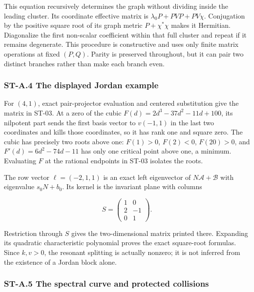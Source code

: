 \documentclass[a4paper,11pt]{article}
\numberwithin{equation}{section}
\begin{document}
This equation recursively determines the graph without dividing inside the leading cluster. Its coordinate effective matrix is \(\lambda_0P+PVP+PV\chi\). Conjugation by the positive square root of its graph metric \(P+\chi^*\chi\) makes it Hermitian. Diagonalize the first non-scalar coefficient within that full cluster and repeat if it remains degenerate. This procedure is constructive and uses only finite matrix operations at fixed \((P,Q)\). Parity is preserved throughout, but it can pair two distinct branches rather than make each branch even.

\hypertarget{st-a.4-the-displayed-jordan-example}{%
\subsubsection{ST-A.4 The displayed Jordan example}\label{st-a.4-the-displayed-jordan-example}}

For \((4,1)\), exact pair-projector evaluation and centered substitution give the matrix in ST-03. At a zero of the cubic \(F(d)=2d^3-37d^2-11d+100\), its nilpotent part sends the first basis vector to \(v(-1,1)\) in the last two coordinates and kills those coordinates, so it has rank one and square zero. The cubic has precisely two roots above one: \(F(1)>0\), \(F(2)<0\), \(F(20)>0\), and \(F'(d)=6d^2-74d-11\) has only one critical point above one, a minimum. Evaluating \(F\) at the rational endpoints in ST-03 isolates the roots.

The row vector \(\ell=(-2,1,1)\) is an exact left eigenvector of \(N\mathscr A+\mathscr B\) with eigenvalue \(s_0N+b_0\). Its kernel is the invariant plane with columns

\[
S=\begin{pmatrix}1&0\\2&-1\\0&1\end{pmatrix}.
\]

Restriction through \(S\) gives the two-dimensional matrix printed there. Expanding its quadratic characteristic polynomial proves the exact square-root formulas. Since \(k,v>0\), the resonant splitting is actually nonzero; it is not inferred from the existence of a Jordan block alone.

\hypertarget{st-a.5-the-spectral-curve-and-protected-collisions}{%
\subsubsection{ST-A.5 The spectral curve and protected collisions}\label{st-a.5-the-spectral-curve-and-protected-collisions}}
\end{document}
